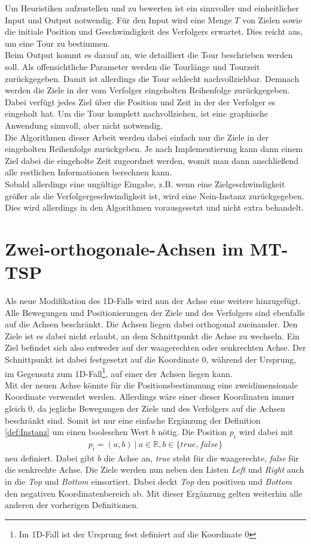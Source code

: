 \documentclass[german,version-2019-11]{uzl-thesis}
\begin{document}
Um Heuristiken aufzustellen und zu bewerten ist ein sinnvoller und einheitlicher Input und Output notwendig. Für den Input wird eine Menge $T$ von Zielen sowie die initiale Position und Geschwindigkeit des Verfolgers erwartet. Dies reicht aus, um eine Tour zu bestimmen. \\
Beim Output kommt es darauf an, wie detailliert die Tour beschrieben werden soll. Als offensichtliche Parameter werden die Tourlänge und Tourzeit zurückgegeben. Damit ist allerdings die Tour schlecht nachvollziehbar. Demnach werden die Ziele in der vom Verfolger eingeholten Reihenfolge zurückgegeben. Dabei verfügt jedes Ziel über die Position und Zeit in der der Verfolger es eingeholt hat. Um die Tour komplett nachvollziehen, ist eine graphische Anwendung sinnvoll, aber nicht notwendig. \\
Die Algorithmen dieser Arbeit werden dabei einfach nur die Ziele in der eingeholten Reihenfolge zurückgeben. Je nach Implementierung kann dann einem Ziel dabei die eingeholte Zeit zugeordnet werden, womit man dann anschließend alle restlichen Informationen berechnen kann. \\
Sobald allerdings eine ungültige Eingabe, z.B. wenn eine Zielgeschwindigkeit größer als die Verfolgergeschwindigkeit ist, wird eine \glqq Nein\grqq-Instanz zurückgegeben. Dies wird allerdings in den Algorithmen vorausgesetzt und nicht extra behandelt. 

\chapter{Zwei-orthogonale-Achsen im MT-TSP}

Als neue Modifikation des 1D-Falls wird nun der Achse eine weitere hinzugefügt. Alle Bewegungen und Positionierungen der Ziele und des Verfolgers sind ebenfalls auf die Achsen beschränkt. Die Achsen liegen dabei orthogonal zueinander. Den Ziele ist es dabei nicht erlaubt, an dem Schnittpunkt die Achse zu wechseln. Ein Ziel befindet sich also entweder auf der waagerechten oder senkrechten Achse. Der Schnittpunkt ist dabei festgesetzt auf die Koordinate $0$, während der Ursprung, im Gegensatz zum 1D-Fall\footnote{Im 1D-Fall ist der Ursprung fest definiert auf die Koordinate $0$}, auf einer der Achsen liegen kann.\\
Mit der neuen Achse könnte für die Positionsbestimmung eine zweidimensionale Koordinate verwendet werden. Allerdings wäre einer dieser Koordinaten immer gleich $0$, da jegliche Bewegungen der Ziele und des Verfolgers auf die Achsen beschränkt sind. Somit ist nur eine einfache Ergänzung der Definition \ref{def:Instanz} um einen booleschen Wert $b$ nötig. Die Position $p_i$ wird dabei mit 
\begin{align*}
p_i = (a, b) ~|~a\in\mathbb{R}, b\in \{true, false\}
\end{align*}
neu definiert. Dabei gibt $b$ die Achse an, \emph{true} steht für die waagerechte, \emph{false} für die senkrechte Achse. Die Ziele werden nun neben den Listen \emph{Left} und \emph{Right} auch in die \emph{Top} und \emph{Bottom} einsortiert. Dabei deckt \emph{Top} den positiven und \emph{Bottom} den negativen Koordinatenbereich ab. Mit dieser Ergänzung gelten weiterhin alle anderen der vorherigen Definitionen.
\end{document}
